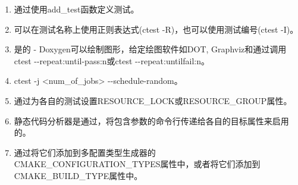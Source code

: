 

\begin{enumerate}
\item 
通过使用add\_test函数定义测试。

\item
可以在测试名称上使用正则表达式(ctest -R)，也可以使用测试编号(ctest -I)。

\item 
是的 - Doxygen可以绘制图形，给定绘图软件如DOT, Graphviz和通过调用ctest -{}-repeat:until-pass:n或ctest -{}-repeat:untilfail:n。

\item 
ctest -j <num\_of\_jobs> -{}-schedule-random。

\item 
通过为各自的测试设置RESOURCE\_LOCK或RESOURCE\_GROUP属性。

\item 
静态代码分析器是通过，将包含参数的命令行传递给各自的目标属性来启用的。

\item 
通过将它们添加到多配置类型生成器的CMAKE\_CONFIGURATION\_TYPES属性中，或者将它们添加到CMAKE\_BUILD\_TYPE属性中。
\end{enumerate}